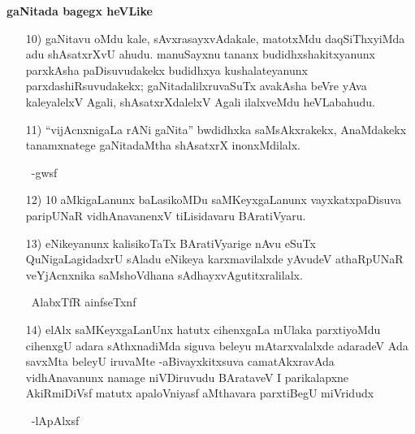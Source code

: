 \begin{center}
{\bf gaNitada bagegx heVLike} 
\end{center}
\begin{enumerate}
\item[\rm 10)] gaNitavu oMdu kale, sAvxrasayxvAdakale, matotxMdu daqSiThxyiMda adu shAsatxrXvU ahudu. manuSayxnu tananx budidhxshakitxyanunx parxkAsha paDisuvudakekx budidhxya kushalateyanunx parxdashiRsuvudakekx; gaNitadalilxruvaSuTx avakAsha beVre yAva kaleyalelxV Agali, shAsatxrXdalelxV Agali ilalxveMdu heVLabahudu.

\item[\rm 11)] ``vijAcnxnigaLa rANi gaNita'' bwdidhxka saMsAkxrakekx, AnaMdakekx tanamxnatege gaNitadaMtha shAsatxrX inonxMdilalx.

~\hfill -gwsf

\item[\rm 12)] {\rm 10} aMkigaLanunx baLasikoMDu saMKeyxgaLanunx vayxkatxpaDisuva paripUNaR vidhAna\-vanenxV tiLisidavaru BAratiVyaru.

\item[\rm 13)] eNikeyanunx kalisikoTaTx BAratiVyarige nAvu eSuTx QuNigaLagidadxrU sAladu eNikeya karxmavilalxde yAvudeV athaRpUNaR veYjAcnxnika saMshoVdhana sAdhayx\-vAgutitxralilalx.

~\hfill AlabxTfR ainfseTxnf

\item[\rm 14)] elAlx saMKeyxgaLanUnx hatutx cihenxgaLa mUlaka parxtiyoMdu cihenxgU adara sAthxnadiMda siguva beleyu mAtarxvalalxde adaradeV Ada savxMta beleyU iruvaMte -aBivayxkitxsuva camatAkxravAda vidhAnavanunx namage niVDiruvudu BArataveV I parikalapxne AkiRmiDiVsf matutx apaloVniyasf aMthavara parxtiBegU miVridudx

~\hfill -lApAlxsf
\end{enumerate}
